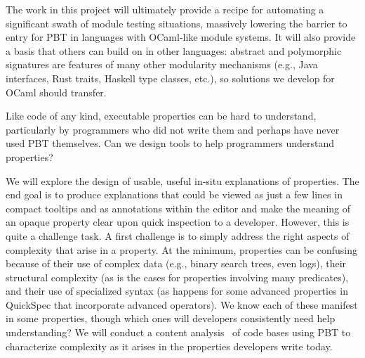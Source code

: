 The work in this project will ultimately provide a recipe for automating a
significant swath of module testing situations, massively lowering the
barrier to entry
for PBT in languages with OCaml-like module
systems. It will also
provide a basis that others can
build on in other languages: abstract and polymorphic signatures are features of
many other modularity mechanisms (e.g., Java interfaces, Rust traits, Haskell
type classes, etc.), so solutions we develop for OCaml should
transfer.


Like code of any kind, executable properties can
be hard to understand, particularly by programmers who did not write
them and perhaps have never used PBT themselves. Can we design
tools to help programmers understand properties?

We will explore the design of usable, useful in-situ explanations of properties.  
The end goal is to produce explanations that could be viewed as just a few lines 
in compact tooltips and as annotations within the editor and make the meaning of 
an opaque property clear upon quick inspection to a developer. However, this is 
quite a challenge task. A first challenge is to simply address the right aspects 
of complexity that arise in a property. At the minimum, properties can be 
confusing because of their use of complex data (e.g., binary search trees, even 
logs), their structural complexity (as is the cases for properties involving 
many predicates), and their use of specialized syntax (as happens for some 
advanced properties in QuickSpec that incorporate advanced operators). We know 
each of these manifest in some properties, though which ones will developers 
consistently need help understanding? We will conduct a content 
analysis~\cite{ref:krippendorff2018content} of code bases using
PBT to characterize complexity as it arises in the properties developers write 
today.

